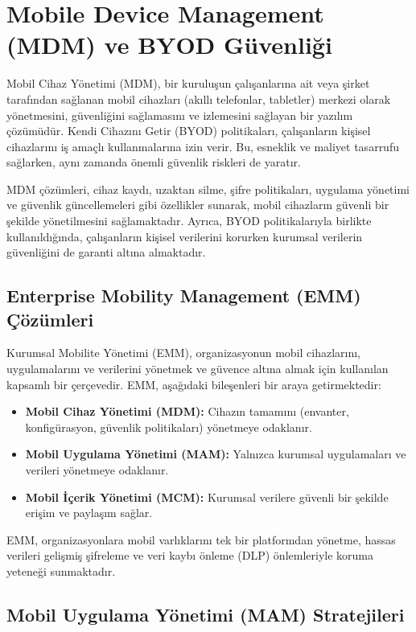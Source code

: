 \newpage

\section{Mobile Device Management (MDM) ve BYOD Güvenliği}

Mobil Cihaz Yönetimi (MDM), bir kuruluşun çalışanlarına ait veya şirket tarafından sağlanan mobil cihazları (akıllı telefonlar, tabletler) merkezi olarak yönetmesini, güvenliğini sağlamasını ve izlemesini sağlayan bir yazılım çözümüdür. Kendi Cihazını Getir (BYOD) politikaları, çalışanların kişisel cihazlarını iş amaçlı kullanmalarına izin verir. Bu, esneklik ve maliyet tasarrufu sağlarken, aynı zamanda önemli güvenlik riskleri de yaratır.

MDM çözümleri, cihaz kaydı, uzaktan silme, şifre politikaları, uygulama yönetimi ve güvenlik güncellemeleri gibi özellikler sunarak, mobil cihazların güvenli bir şekilde yönetilmesini sağlamaktadır. Ayrıca, BYOD politikalarıyla birlikte kullanıldığında, çalışanların kişisel verilerini korurken kurumsal verilerin güvenliğini de garanti altına almaktadır.

\subsection{Enterprise Mobility Management (EMM) Çözümleri}

Kurumsal Mobilite Yönetimi (EMM), organizasyonun mobil cihazlarını, uygulamalarını ve verilerini yönetmek ve güvence altına almak için kullanılan kapsamlı bir çerçevedir. EMM, aşağıdaki bileşenleri bir araya getirmektedir:

\begin{itemize}
    \item \textbf{Mobil Cihaz Yönetimi (MDM):} Cihazın tamamını (envanter, konfigürasyon, güvenlik politikaları) yönetmeye odaklanır.
    \item \textbf{Mobil Uygulama Yönetimi (MAM):} Yalnızca kurumsal uygulamaları ve verileri yönetmeye odaklanır.
    \item \textbf{Mobil İçerik Yönetimi (MCM):} Kurumsal verilere güvenli bir şekilde erişim ve paylaşım sağlar.
\end{itemize}

EMM, organizasyonlara mobil varlıklarını tek bir platformdan yönetme, hassas verileri gelişmiş şifreleme ve veri kaybı önleme (DLP) önlemleriyle koruma yeteneği sunmaktadır.

\subsection{Mobil Uygulama Yönetimi (MAM) Stratejileri}

